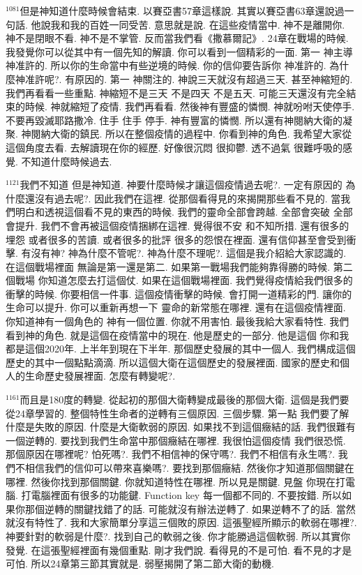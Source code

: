 \documentclass{book}
\begin{document}
$^{1081}$但是神知道什麼時候會結束.
以賽亞書57章這樣說.
其實以賽亞書63章還說過一句話.
他說我和我的百姓一同受苦.
意思就是說.
在這些疫情當中.
神不是離開你.
神不是閉眼不看.
神不是不掌管.
反而當我們看《撒慕爾記》.
24章在戰場的時候.
我發覺你可以從其中有一個先知的解讀.
你可以看到一個精彩的一面.
第一 神主導 神准許的.
所以你的生命當中有些逆境的時候.
你的信仰要告訴你 神准許的.
為什麼神准許呢?.
有原因的.
第一 神關注的.
神說三天就沒有超過三天.
甚至神縮短的.
我們再看看一些重點.
神縮短不是三天 不是四天 不是五天.
可能三天還沒有完全結束的時候.
神就縮短了疫情.
我們再看看.
然後神有豐盛的憐憫.
神就吩咐天使停手.
不要再毀滅耶路撒冷.
住手 住手 停手.
神有豐富的憐憫.
所以還有神閱納大衛的凝聚.
神閱納大衛的鎮民.
所以在整個疫情的過程中.
你看到神的角色.
我希望大家從這個角度去看.
去解讀現在你的經歷.
好像很沉悶 很抑鬱.
透不過氣 很難呼吸的感覺.
不知道什麼時候過去.

$^{1121}$我們不知道 但是神知道.
神要什麼時候才讓這個疫情過去呢?.
一定有原因的 為什麼還沒有過去呢?.
因此我們在這裡.
從那個看得見的來揭開那些看不見的.
當我們明白和透視這個看不見的東西的時候.
我們的靈命全部會跨越.
全部會突破 全部會提升.
我們不會再被這個疫情捆綁在這裡.
覺得很不安 和不知所措.
還有很多的埋怨 或者很多的苦讀.
或者很多的批評 很多的怨恨在裡面.
還有信仰甚至會受到衝擊.
有沒有神? 神為什麼不管呢?.
神為什麼不理呢?.
這個是我介紹給大家認識的.
在這個戰場裡面 無論是第一還是第二.
如果第一戰場我們能夠靠得勝的時候.
第二個戰場 你知道怎麼去打這個仗.
如果在這個戰場裡面.
我們覺得疫情給我們很多的衝擊的時候.
你要相信一件事.
這個疫情衝擊的時候.
會打開一道精彩的門.
讓你的生命可以提升.
你可以重新再想一下 靈命的新常態在哪裡.
還有在這個疫情裡面.
你知道神有一個角色的 神有一個位置.
你就不用害怕.
最後我給大家看特性.
我們看到神的角色.
就是這個在疫情當中的現在.
他是歷史的一部分.
他是這個 你和我都是這個2020年.
上半年到現在下半年.
那個歷史發展的其中一個人.
我們構成這個歷史的其中一個點點滴滴.
所以這個大衛在這個歷史的發展裡面.
國家的歷史和個人的生命歷史發展裡面.
怎麼有轉變呢?.

$^{1161}$而且是180度的轉變.
從起初的那個大衛轉變成最後的那個大衛.
這個是我們要從24章學習的.
整個特性生命者的逆轉有三個原因.
三個步驟.
第一點 我們要了解什麼是失敗的原因.
什麼是大衛軟弱的原因.
如果找不到這個癥結的話.
我們很難有一個逆轉的.
要找到我們生命當中那個癥結在哪裡.
我很怕這個疫情 我們很恐慌.
那個原因在哪裡呢? 怕死嗎?.
我們不相信神的保守嗎?.
我們不相信有永生嗎?.
我們不相信我們的信仰可以帶來喜樂嗎?.
要找到那個癥結.
然後你才知道那個關鍵在哪裡.
然後你找到那個關鍵.
你就知道特性在哪裡.
所以見是關鍵.
見盤 你現在打電腦.
打電腦裡面有很多的功能鍵.
Function key 每一個都不同的.
不要按錯.
所以如果你那個逆轉的關鍵找錯了的話.
可能就沒有辦法逆轉了.
如果逆轉不了的話.
當然就沒有特性了.
我和大家簡單分享這三個敗的原因.
這張聖經所顯示的軟弱在哪裡?.
神要針對的軟弱是什麼?.
找到自己的軟弱之後.
你才能勝過這個軟弱.
所以其實你發覺.
在這張聖經裡面有幾個重點.
剛才我們說.
看得見的不是可怕.
看不見的才是可怕.
所以24章第三節其實就是.
弱壓揭開了第二節大衛的動機.
\end{document}
